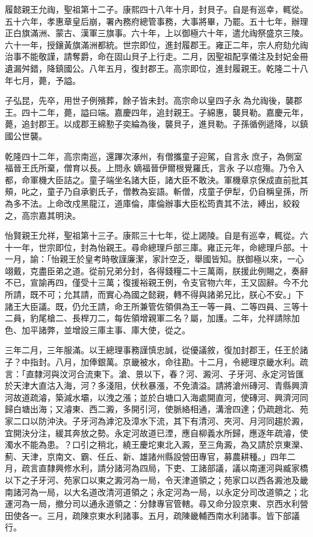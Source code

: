 \begin{pinyinscope}
履懿親王允祹，聖祖第十二子。康熙四十八年十月，封貝子。自是有巡幸，輒從。五十六年，孝惠章皇后崩，署內務府總管事務，大事將畢，乃罷。五十七年，辦理正白旗滿洲、蒙古、漢軍三旗事。六十年，上以御極六十年，遣允祹祭盛京三陵。六十一年，授鑲黃旗滿洲都統。世宗即位，進封履郡王。雍正二年，宗人府劾允祹治事不能敬謹，請奪爵，命在固山貝子上行走。二月，因聖祖配享儀注及封妃金冊遺漏舛錯，降鎮國公。八年五月，復封郡王。高宗即位，進封履親王。乾隆二十八年七月，薨，予謚。

子弘昆，先卒，用世子例殯葬，餘子皆未封。高宗命以皇四子永為允祹後，襲郡王。四十二年，薨，謚曰端。嘉慶四年，追封親王。子綿惠，襲貝勒。嘉慶元年，薨，追封郡王。以成郡王綿懃子奕綸為後，襲貝子，進貝勒。子孫循例遞降，以鎮國公世襲。

乾隆四十二年，高宗南巡，還蹕次涿州，有僧攜童子迎駕，自言永庶子，為側室福晉王氏所棄，僧育以長。上問永嫡福晉伊爾根覺羅氏，言永子以痘殤。乃令入都，命軍機大臣詰之。童子端坐名諸大臣，諸大臣不敢決。軍機章京保成直前批其頰，叱之，童子乃自承劉氏子，僧教為妄語。斬僧，戍童子伊犁，仍自稱皇孫，所為多不法。上命改戍黑龍江，道庫倫，庫倫辦事大臣松筠責其不法，縛出，絞殺之，高宗嘉其明決。

怡賢親王允祥，聖祖第十三子。康熙三十七年，從上謁陵。自是有巡幸，輒從。六十一年，世宗即位，封為怡親王。尋命總理戶部三庫。雍正元年，命總理戶部。十一月，諭：「怡親王於皇考時敬謹廉潔，家計空乏，舉國皆知。朕御極以來，一心翊戴，克盡臣弟之道。從前兄弟分封，各得錢糧二十三萬兩，朕援此例賜之，奏辭不已，宣諭再四，僅受十三萬；復援裕親王例，令支官物六年，王又固辭。今不允所請，既不可；允其請，而實心為國之懿親，轉不得與諸弟兄比，朕心不安。」下諸王大臣議。既，仍允王請，命王所兼管佐領俱為王一等一員、二等四員、三等十二員，豹尾槍二、長桿刀二，每佐領增親軍二名？屬，加護。二年，允祥請除加色、加平諸弊，並增設三庫主事、庫大使，從之。

三年二月，三年服滿。以王總理事務謹慎忠誠，從優議敘，復加封郡王，任王於諸子？中指封。八月，加俸銀萬。京畿被水，命往勘。十二月，令總理京畿水利。疏言：「直隸河與汶河合流東下。滄、景以下，春？河、澱河、子牙河、永定河皆匯於天津大直沽入海，河？多淺阻，伏秋暴漲，不免潰溢。請將滄州磚河、青縣興濟河故道疏濬，築減水壩，以洩之漲；並於白塘口入海處開直河，使磚河、興濟河同歸白塘出海；又濬東、西二澱，多開引河，使脈絡相通，溝澮四達；仍疏趙北、苑家二口以防沖決。子牙河為滹沱及漳水下流，其下有清河、夾河、月河同趨於澱，宜開決分注，緩其奔放之勢。永定河故道已湮，應自柳義水所歸，應逐年疏濬，使濁水不能為患。？口引之稍北，繞王慶坨東北入澱，至三角澱，為又請於京東灤、薊、天津，京南文、霸、任丘、新、雄諸州縣設營田專官，募農耕種。」四年二月，疏言直隸興修水利，請分諸河為四局，下吏、工諸部議，議以南運河與臧家橋以下之子牙河、苑家口以東之澱河為一局，令天津道領之；苑家口以西各澱池及畿南諸河為一局，以大名道改清河道領之；永定河為一局，以永定分司改道領之；北運河為一局，撤分司以通永道領之：分隸專官管轄。尋又命分設京東、京西水利營田使各一。三月，疏陳京東水利諸事。五月，疏陳畿輔西南水利諸事。皆下部議行。


\end{pinyinscope}
